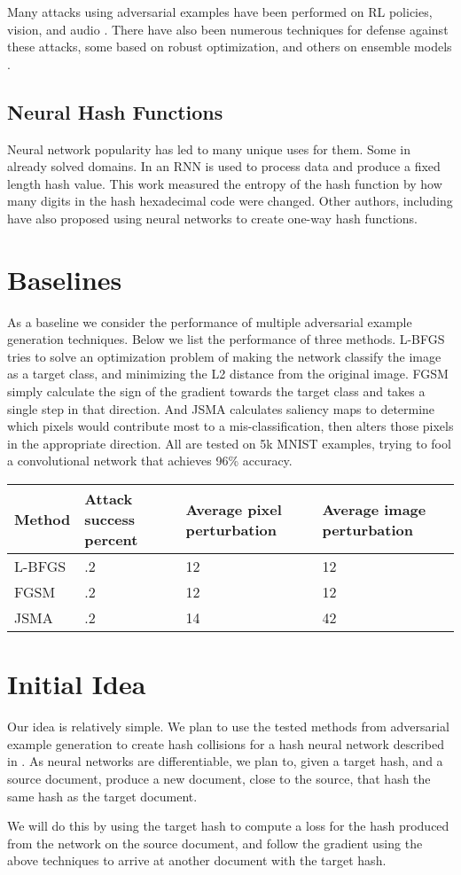 \documentclass{article}
\begin{document}
Many attacks using adversarial examples have been performed on RL policies, vision,
and audio \cite{policy,intriguing,audio}. There have also been numerous techniques
for defense against these attacks, some based on robust optimization, and others
on ensemble models \cite{robust,ensemble}.

\subsection{Neural Hash Functions}

Neural network popularity has led to many unique uses for them. Some in already
solved domains. In \cite{hash1} an RNN is used to process data and produce
a fixed length hash value. This work measured the entropy of the hash function
by how many digits in the hash hexadecimal code were changed. Other authors,
including \cite{hash2} have also proposed using neural networks to create
one-way hash functions.

\section{Baselines}

As a baseline we consider the performance of multiple adversarial example
generation techniques. Below we list the performance of three methods. L-BFGS
tries to solve an optimization problem of making the network classify the image as
a target class, and minimizing the L2 distance from the original image. FGSM simply
calculate the sign of the gradient towards the target class and takes a single 
step in that direction. And JSMA calculates saliency maps to determine which pixels
would contribute most to a mis-classification, then alters those pixels in the
appropriate direction. All are tested on 5k MNIST examples, trying to fool
a convolutional network that achieves 96\% accuracy.

\begin{tabular}{l | l l l}
    Method & Attack success percent & Average pixel perturbation & Average image perturbation \\ \hline
    L-BFGS & .2 & 12 & 12 \\
    FGSM & .2 & 12 & 12 \\
    JSMA & .2 & 14 & 42
\end{tabular}

\section{Initial Idea}

Our idea is relatively simple. We plan to use the tested methods from adversarial example generation to
create hash collisions for a hash neural network described in \cite{hash1}. As neural networks are 
differentiable, we plan to, given a target hash, and a source document, produce a new document, close 
to the source, that hash the same hash as the target document. 

We will do this by using the target hash to compute a loss for the hash produced from the network on the
source document, and follow the gradient using the above techniques to arrive at another document with the
target hash.

 
\end{document}
